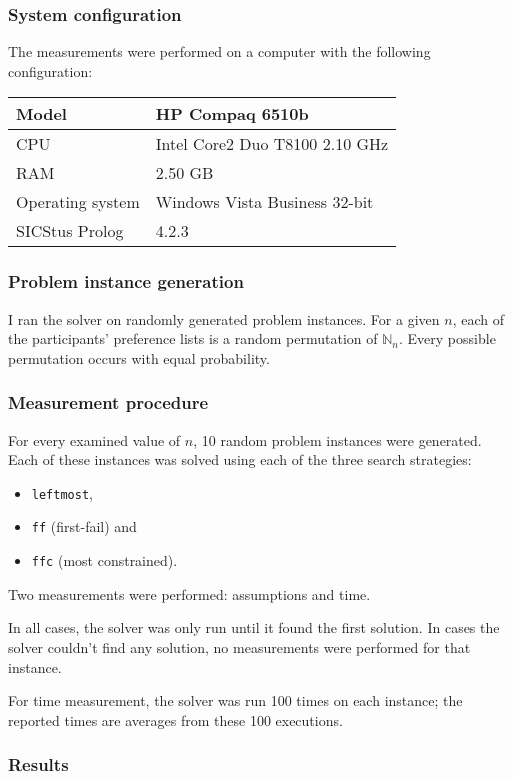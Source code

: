 \documentclass{article}
\newcommand{\nn}{\mathbb{N}_n}
\newcommand{\code}[1]{\texttt{#1}}
\newcommand{\prolog}{Prolog}
\newcommand{\sicstusprolog}{SICStus \prolog{}}
\begin{document}
\subsubsection{System configuration}
The measurements were performed on a computer with the following configuration:

\begin{tabular}{| l | l |}
\hline
Model & HP Compaq 6510b \\
\hline
CPU & Intel Core2 Duo T8100 2.10 GHz \\
\hline
RAM & 2.50 GB \\
\hline
Operating system & Windows Vista Business 32-bit \\
\hline
\sicstusprolog{} & 4.2.3 \\
\hline
\end{tabular}

\subsubsection{Problem instance generation}
I ran the solver on randomly generated problem instances.
For a given $n$, each of the participants' preference lists
is a random permutation of $\nn$.
Every possible permutation occurs with equal probability.

\subsubsection{Measurement procedure}
For every examined value of $n$, 10 random problem instances were generated.
Each of these instances was solved using each of the three search strategies:

\begin{itemize}
\item \code{leftmost},
\item \code{ff} (first-fail) and
\item \code{ffc} (most constrained).
\end{itemize}

Two measurements were performed: assumptions and time.

In all cases, the solver was only run until it found the first solution.
In cases the solver couldn't find any solution,
no measurements were performed for that instance.

For time measurement, the solver was run 100 times on each instance;
the reported times are averages from these 100 executions.

\subsubsection{Results}


\printglossaries{}
\end{document}
